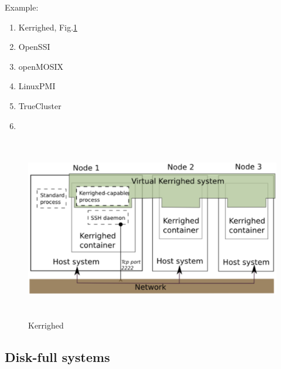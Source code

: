 Example:
\begin{enumerate}
  \item Kerrighed, Fig.\ref{fig:SSI_Kerrighed}
  \item OpenSSI
  \item openMOSIX
  \item LinuxPMI
  \item TrueCluster
  \item 
\end{enumerate}

\begin{figure}[hbt]
  \centerline{\includegraphics[height=8cm,
    angle=0]{./images/SSI_Kerrighed.eps}}
\caption{Kerrighed}
\label{fig:SSI_Kerrighed}
\end{figure}

\subsection{Disk-full systems}

